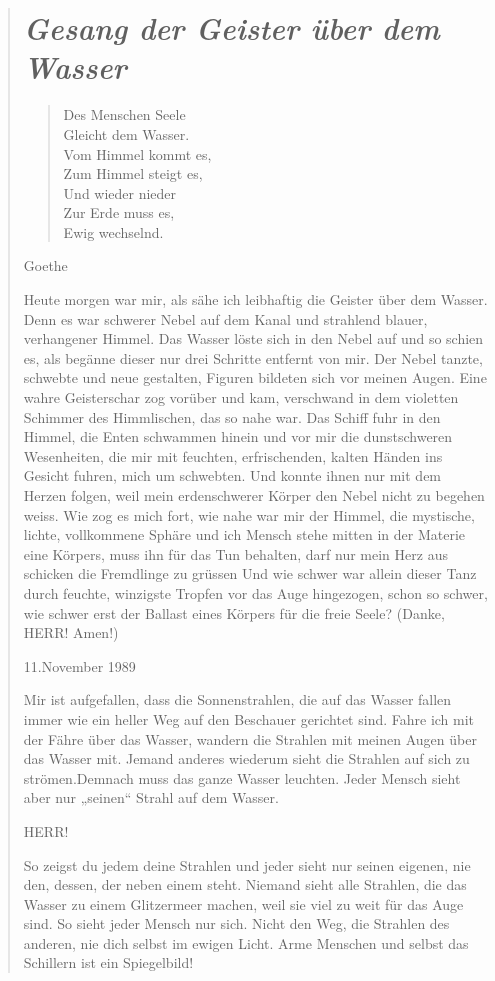 \documentclass[10pt,a5paper]{book}
\newenvironment{tg}{\begin{quote}\em}{\end{quote}}
\newenvironment{dichter}{\begin{flushright}}{\end{flushright}}
\begin{document}
\begin{tg}




\section*{\em Gesang der Geister über dem Wasser}


\begin{verse}
Des Menschen Seele\\
Gleicht dem Wasser.\\
Vom Himmel kommt es,\\
Zum Himmel steigt es,\\
Und wieder nieder\\
Zur Erde muss es,\\
Ewig wechselnd.
\end{verse}
\begin{dichter} Goethe \end{dichter}


Heute morgen war mir, als sähe ich leibhaftig die Geister über dem Wasser.
Denn es war schwerer Nebel auf dem Kanal und strahlend blauer, verhangener Himmel. Das Wasser löste sich in den Nebel auf und so schien es, als begänne dieser nur drei Schritte entfernt von mir. Der Nebel tanzte, schwebte und neue gestalten, Figuren bildeten sich vor meinen Augen. Eine wahre Geisterschar zog vorüber und kam, verschwand in dem violetten Schimmer des Himmlischen, das so nahe war. Das Schiff fuhr in den Himmel, die Enten schwammen hinein und vor mir die dunstschweren Wesenheiten, die mir mit feuchten, erfrischenden, kalten Händen ins Gesicht fuhren, mich um schwebten. Und konnte ihnen nur mit dem Herzen folgen, weil mein erdenschwerer Körper den Nebel nicht zu  begehen weiss. Wie zog es mich fort, wie nahe war mir der Himmel, die mystische, lichte, vollkommene Sphäre und ich Mensch stehe mitten in der Materie eine Körpers, muss ihn für das Tun behalten, darf nur mein Herz aus schicken die Fremdlinge zu grüssen Und wie schwer war allein dieser Tanz durch feuchte, winzigste Tropfen vor das Auge hingezogen, schon so schwer, wie schwer erst der Ballast eines Körpers für die freie Seele? (Danke, HERR! Amen!)

11.November 1989

Mir ist aufgefallen, dass die Sonnenstrahlen, die auf das Wasser fallen immer wie ein heller Weg auf den Beschauer gerichtet sind. Fahre ich mit der Fähre über das Wasser, wandern die Strahlen mit meinen Augen über das Wasser mit. Jemand anderes wiederum sieht die Strahlen auf sich zu strömen.Demnach muss das ganze Wasser leuchten. Jeder Mensch sieht aber nur „seinen“ Strahl auf dem Wasser.

HERR!

So zeigst du jedem deine Strahlen und jeder sieht nur seinen eigenen, nie den, dessen, der neben einem steht. Niemand sieht alle Strahlen, die das Wasser zu einem Glitzermeer machen, weil sie viel zu weit für das Auge sind. So sieht jeder Mensch nur sich. Nicht den Weg, die Strahlen des anderen, nie dich selbst im ewigen Licht. Arme Menschen und selbst das Schillern ist ein Spiegelbild!
\end{tg}
\end{document}

